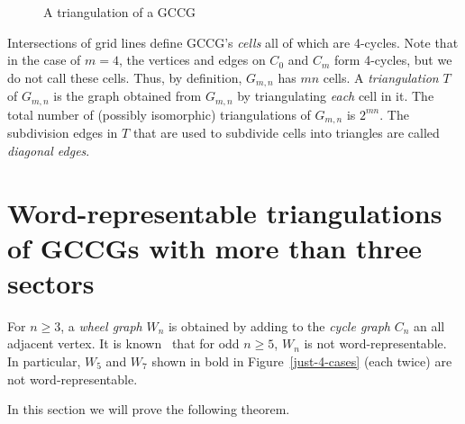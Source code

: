 \documentclass[12pt]{article}
\numberwithin{equation}{section}
\begin{document}
 \begin{figure}[!htbp]
 \begin{center}
\caption{A triangulation of a GCCG}\label{triang-grid-cover-cylinder-general}
\end{center}
\end{figure}

Intersections of grid lines define GCCG's {\em cells}  all of which are 4-cycles. Note that in the case of $m=4$, the vertices and edges on $C_0$ and $C_m$ form 4-cycles, but we do not call these cells. Thus, by definition, $G_{m,n}$ has $mn$ cells.  A {\em triangulation} $T$ of $G_{m,n}$ is the graph obtained from $G_{m,n}$ by triangulating {\em each} cell in it. The total number of (possibly isomorphic) triangulations of $G_{m,n}$ is $2^{mn}$. The subdivision edges in $T$ that are used to subdivide cells into triangles are called {\em diagonal edges}.

\section{Word-representable triangulations of GCCGs with more than three sectors}\label{sec3}

For $n\geq 3$, a {\em wheel graph} $W_n$ is obtained by adding to the {\em cycle graph} $C_n$ an all adjacent vertex. It is known~\cite{KitLoz,Kitaev08a} that for odd $n\geq 5$, $W_n$ is not word-representable. In particular, $W_5$ and $W_7$ shown in bold in Figure~\ref{just-4-cases} (each twice) are not word-representable.

In this section we will prove the following theorem.
\end{document}
